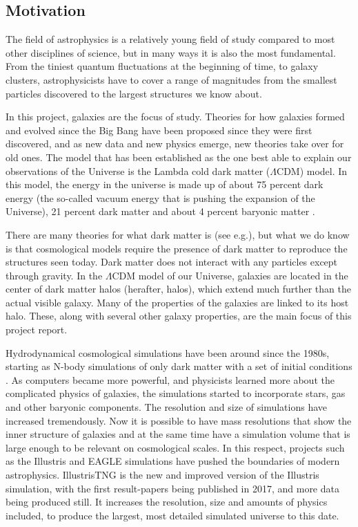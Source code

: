
\noindent
\subsection{Motivation}
The field of astrophysics is a relatively young field of study compared to most other disciplines of science, but in many ways it is also the most fundamental. From the tiniest quantum fluctuations at the beginning of time, to galaxy clusters, astrophysicists have to cover a range of magnitudes from the smallest particles discovered to the largest structures we know about. 

In this project, galaxies are the focus of study. Theories for how galaxies formed and evolved since the Big Bang have been proposed since they were first discovered, and as new data and new physics emerge, new theories take over for old ones. The model that has been established as the one best able to explain our observations of the Universe is the Lambda cold dark matter ($\Lambda$CDM) model. In this model, the energy in the universe is made up of about 75 percent dark energy (the so-called vacuum energy that is pushing the expansion of the Universe), 21 percent dark matter and about 4 percent baryonic matter \parencite{white}. 

There are many theories for what dark matter is (see e.g.\cite{Boveia2018}), but what we do know is that cosmological models require the presence of dark matter to reproduce the structures seen today. Dark matter does not interact with any particles except through gravity. In the $\Lambda$CDM model of our Universe, galaxies are located in the center of dark matter halos (herafter, halos), which extend much further than the actual visible galaxy. Many of the properties of the galaxies are linked to its host halo. These, along with several other galaxy properties, are the main focus of this project report.

Hydrodynamical cosmological simulations have been around since the 1980s, starting as N-body simulations of only dark matter with a set of initial conditions \parencite{Frenk1983}. As computers became more powerful, and physicists learned more about the complicated physics of galaxies, the simulations started to incorporate stars, gas and other baryonic components. The resolution and size of simulations have increased tremendously. Now it is possible to have mass resolutions that show the inner structure of galaxies and at the same time have a simulation volume that is large enough to be relevant on cosmological scales. In this respect, projects such as the Illustris and EAGLE simulations have pushed the boundaries of modern astrophysics. IllustrisTNG is the new and improved version of the Illustris simulation, with the first result-papers being published in 2017, and more data being produced still. It increases the resolution, size and amounts of physics included, to produce the largest, most detailed simulated universe to this date. 


